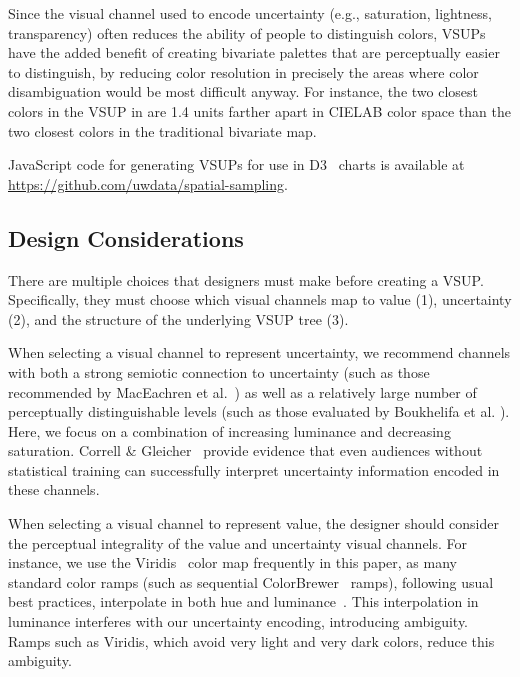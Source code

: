 Since the visual channel used to encode uncertainty (e.g., saturation, lightness, transparency) often reduces the ability of people to distinguish colors, VSUPs have the added benefit of creating bivariate palettes that are perceptually easier to distinguish, by reducing color resolution in precisely the areas where color disambiguation would be most difficult anyway. For instance, the two closest colors in the VSUP in  are 1.4 units farther apart in CIELAB color space than the two closest colors in the traditional bivariate map.

JavaScript code for generating VSUPs for use in D3~\cite{bostock2011d3} charts is available at \url{https://github.com/uwdata/spatial-sampling}.

\subsection{Design Considerations}

There are multiple choices that designers must make before creating a VSUP. Specifically, they must choose which visual channels map to value (1), uncertainty (2), and the structure of the underlying VSUP tree (3).

When selecting a visual channel to represent uncertainty, we recommend channels with both a strong semiotic connection to uncertainty (such as those recommended by MacEachren et al.~\cite{maceachren2012visual}) as well as a relatively large number of perceptually distinguishable levels (such as those evaluated by Boukhelifa et al. \cite{boukhelifa2012evaluating}). Here, we focus on a combination of increasing luminance and decreasing saturation. Correll \& Gleicher~\cite{correll2014error} provide evidence that even audiences without statistical training can successfully interpret uncertainty information encoded in these channels.

When selecting a visual channel to represent value, the designer should consider the perceptual integrality of the value and uncertainty visual channels. For instance, we use the Viridis~\cite{viridis} color map frequently in this paper, as many standard color ramps (such as sequential ColorBrewer~\cite{harrower2003colorbrewer} ramps), following usual best practices, interpolate in both hue and luminance~\cite{ware1988color}. This interpolation in luminance interferes with our uncertainty encoding, introducing ambiguity. Ramps such as Viridis, which avoid very light and very dark colors, reduce this ambiguity.

